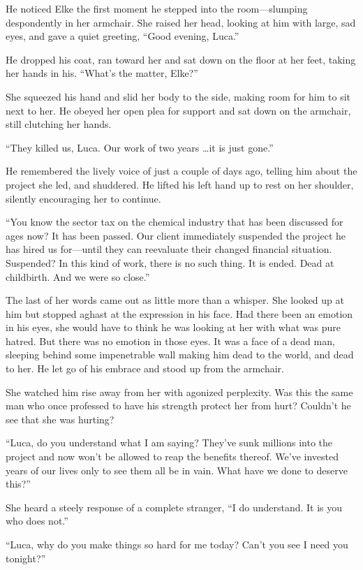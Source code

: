 He noticed Elke the first moment he stepped into the room---slumping despondently in her armchair. She raised her head, looking at him with large, sad eyes, and gave a quiet greeting, ``Good evening, Luca.''

He dropped his coat, ran toward her and sat down on the floor at her feet, taking her hands in his. ``What's the matter, Elke?''

She squeezed his hand and slid her body to the side, making room for him to sit next to her. He obeyed her open plea for support and sat down on the armchair, still clutching her hands.

``They killed us, Luca. Our work of two years \ldots it is just gone.''

He remembered the lively voice of just a couple of days ago, telling him about the project she led, and shuddered. He lifted his left hand up to rest on her shoulder, silently encouraging her to continue.

``You know the sector tax on the chemical industry that has been discussed for ages now? It has been passed. Our client immediately suspended the project he has hired us for---until they can reevaluate their changed financial situation. Suspended? In this kind of work, there is no such thing. It is ended. Dead at childbirth. And we were so close.''

The last of her words came out as little more than a whisper. She looked up at him but stopped aghast at the expression in his face. Had there been an emotion in his eyes, she would have to think he was looking at her with what was pure hatred. But there was no emotion in those eyes. It was a face of a dead man, sleeping behind some impenetrable wall making him dead to the world, and dead to her. He let go of his embrace and stood up from the armchair.

She watched him rise away from her with agonized perplexity. Was this the same man who once professed to have his strength protect her from hurt? Couldn't he see that she was hurting?

``Luca, do you understand what I am saying? They've sunk millions into the project and now won't be allowed to reap the benefits thereof. We've invested years of our lives only to see them all be in vain. What have we done to deserve this?''

She heard a steely response of a complete stranger, ``I do understand. It is you who does not.''

``Luca, why do you make things so hard for me today? Can't you see I need you tonight?''


